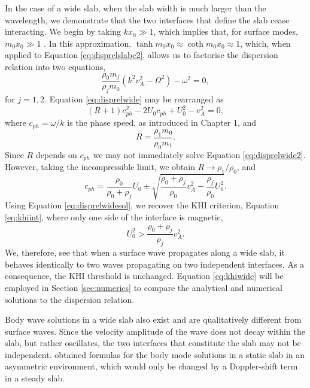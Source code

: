 \documentclass[12pt]{ociamthesis}
\begin{document}
In the case of a wide slab, when the slab width is much larger than the wavelength, we demonstrate that the two interfaces that define the slab cease interacting.
We begin by taking $k x_0 \gg 1$, which implies that, for surface modes, $m_0 x_0 \gg 1$ \citep[verified by][]{Roberts1981b}.
In this approximation, $\tanh m_0 x_0 \approx \coth m_0 x_0 \approx 1$, which, when applied to Equation \eqref{eq:disprelslabc2}, allows us to factorise the dispersion relation into two equations,
%
\begin{equation}
\label{eq:disprelwide}
\frac{\rho_0 m_j}{\rho_j m_0} \left( k^2 v_A^2 - \Omega^2 \right) - \omega^2 = 0,
\end{equation}
%
for $j=1,2$.
Equation \eqref{eq:disprelwide} may be rearranged as
%
\begin{equation}
\label{eq:disprelwide2}
(R+1) c_{ph}^2 - 2 U_0 c_{ph} + U_0^2 - v_A^2 = 0,
\end{equation}
%
where $c_{ph} = \omega / k$ is the phase speed, as introduced in Chapter 1, and
%
\begin{equation}
\label{eq:Rdef}
R = \frac{\rho_1 m_0}{\rho_0 m_1}.
\end{equation}
%
Since $R$ depends on $c_{ph}$ we may not immediately solve Equation \eqref{eq:disprelwide2}.
However, taking the incompressible limit, we obtain $R \to \rho_1 / \rho_0$, and
%
\begin{equation}
\label{eq:disprelwidesol}
c_{ph} = \frac{\rho_0}{ \rho_0 + \rho_j} U_0
\pm \sqrt{\frac{\rho_0 + \rho_j}{\rho_0} v_A^2
- \frac{\rho_j}{\rho_0} U_0^2}.
\end{equation}
%
Using Equation \eqref{eq:disprelwidesol}, we recover the KHI criterion, Equation \eqref{eq:khiint}, where only one side of the interface is magnetic,
%
\begin{equation}
\label{eq:khiwide}
U_0^2 > \frac{\rho_0 + \rho_j}{\rho_j} v_A^2.
\end{equation}
%
We, therefore, see that when a surface wave propagates along a wide slab, it behaves identically to two waves propagating on two independent interfaces.
As a consequence, the KHI threshold is unchanged.
Equation \eqref{eq:khiwide} will be employed in Section \ref{sec:numerics} to compare the analytical and numerical solutions to the dispersion relation.

Body wave solutions in a wide slab also exist and are qualitatively different from surface waves.
Since the velocity amplitude of the wave does not decay within the slab, but rather oscillates, the two interfaces that constitute the slab may not be independent.
\cite{Allcock2017} obtained formulas for the body mode solutions in a static slab in an asymmetric environment, which would only be changed by a Doppler-shift term in a steady slab.
\end{document}
